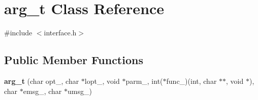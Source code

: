 \hypertarget{classarg__t}{\section{arg\-\_\-t Class Reference}
\label{classarg__t}
}


{\ttfamily \#include $<$interface.\-h$>$}

\subsection*{Public Member Functions}
\begin{DoxyCompactItemize}
\item 
\hypertarget{classarg__t_aa0816102885c0956f557ed2bb7789f83}{{\bfseries arg\-\_\-t} (char opt\-\_\-, char $\ast$lopt\-\_\-, void $\ast$parm\-\_\-, int($\ast$func\-\_\-)(int, char $\ast$$\ast$, void $\ast$), char $\ast$emsg\-\_\-, char $\ast$umsg\-\_\-)}\label{classarg__t_aa0816102885c0956f557ed2bb7789f83}

\end{DoxyCompactItemize}
